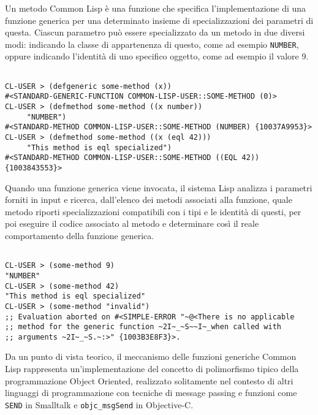 Un metodo Common Lisp è una funzione che specifica l’implementazione di una
funzione generica per una determinato insieme di specializzazioni dei
parametri di questa. Ciascun parametro può essere specializzato da un metodo
in due diversi modi: indicando la classe di appartenenza di questo, come ad
esempio \texttt{NUMBER}, oppure indicando l’identità di uno specifico
oggetto, come ad esempio il valore 9.

\begin{lstlisting}[caption=Esempi definizione di metodi Common Lisp]

CL-USER > (defgeneric some-method (x))
#<STANDARD-GENERIC-FUNCTION COMMON-LISP-USER::SOME-METHOD (0)>
CL-USER > (defmethod some-method ((x number))
     "NUMBER")
#<STANDARD-METHOD COMMON-LISP-USER::SOME-METHOD (NUMBER) {10037A9953}>
CL-USER > (defmethod some-method ((x (eql 42)))
     "This method is eql specialized")
#<STANDARD-METHOD COMMON-LISP-USER::SOME-METHOD ((EQL 42)) {1003843553}>

\end{lstlisting}

Quando una funzione generica viene invocata, il sistema Lisp analizza i
parametri forniti in input e ricerca, dall’elenco dei metodi associati alla
funzione, quale metodo riporti specializzazioni compatibili con i tipi e le
identità di questi, per poi eseguire il codice associato al metodo e
determinare così il reale comportamento della funzione generica.

\begin{lstlisting}[caption=Esempi di invocazione di metodi Common Lisp]

CL-USER > (some-method 9)
"NUMBER"
CL-USER > (some-method 42)
"This method is eql specialized"
CL-USER > (some-method "invalid")
;; Evaluation aborted on #<SIMPLE-ERROR "~@<There is no applicable
;; method for the generic function ~2I~_~S~~I~_when called with
;; arguments ~2I~_~S.~:>" {1003B3E8F3}>.

\end{lstlisting}

Da un punto di vista teorico, il meccanismo delle funzioni generiche Common
Lisp rappresenta un’implementazione del concetto di polimorfismo tipico della
programmazione Object Oriented, realizzato solitamente nel contesto di altri
linguaggi di programmazione con tecniche di message passing e funzioni come
\texttt{SEND} in Smalltalk e \texttt{objc\_msgSend} in Objective-C.\\

